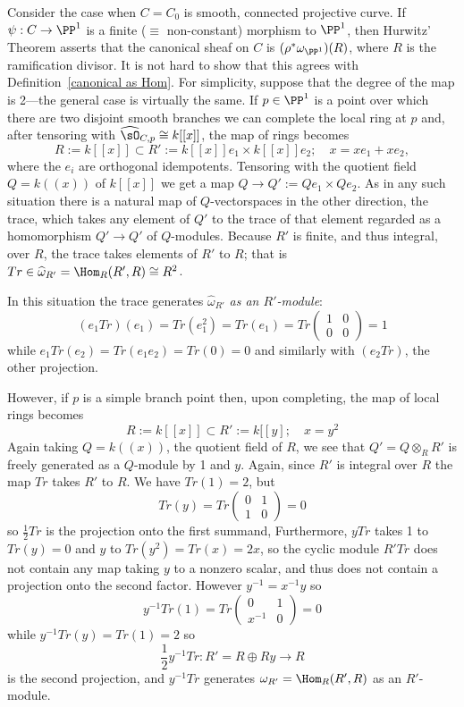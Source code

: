 \begin{example}
Consider the case when $C = C_0$ is smooth, connected projective curve. If $\psi: C\to \PP^1$ is a finite  ($\equiv$ non-constant) morphism to $\PP^1$, then Hurwitz' Theorem asserts that the canonical sheaf on
$C$ is $(\rho^*\omega_{\PP^1})(R)$, where $R$ is the ramification divisor. It is not hard to show that this
agrees with Definition~\ref{canonical as Hom}. For simplicity, suppose that the degree of the map is 2---the general case
is virtually the same. If
 $ p\in\PP^1$ is a point over which there are two disjoint smooth branches
we can complete the local ring at $p$ and, after tensoring
with $\widehat \sO_{C,p} \cong k[[x]]$, the map of rings becomes 
$$
R := k[[x]] \subset R':= k[[x]]e_1\times k[[x]]e_2; \quad x =xe_1+xe_2,
$$
where the $e_i$ are orthogonal idempotents. Tensoring with the quotient field $Q = k((x))$ of $k[[x]]$
we get a map $Q \to Q':= Qe_1\times Qe_2$. As in any such situation there is a natural map of $Q$-vectorspaces in the other direction, the trace, which takes any element of $Q'$ to the trace of that element
regarded as a homomorphism $Q' \to Q'$ of $Q$-modules. Because $R'$ is finite, and thus integral, over $R$, the trace takes elements of $R'$ to $R$; that is $Tr \in \widehat \omega_{R'} = \Hom_R(R', R) \cong R^2$.

In this situation the trace generates $\widehat \omega_{R'}$ \emph{as an $R'$-module}: 
$$
(e_1Tr) (e_1) = Tr(e_1^2) = Tr(e_1) = Tr 
\begin{pmatrix}
 1&0\\0&0
\end{pmatrix} 
=1$$
while $e_1Tr(e_2) = Tr(e_1e_2) = Tr(0) = 0$
and similarly with $(e_2Tr)$, the other projection.

However, if $p$ is a simple branch point then, upon completing, the map of local rings becomes
$$
R := k[[x]] \subset R':= k[[y]; \quad x = y^2
$$
Again taking $Q = k((x))$, the quotient field of $R$, we see that $Q' = Q\otimes_RR'$ is freely generated as a $Q$-module by 1 and $y$. Again, since $R'$ is integral over $R$ the map $Tr$ takes $R'$ to $R$.
We have $Tr(1) = 2$,  but
$$
Tr(y) = Tr
\begin{pmatrix}
 0&1\\1&0
\end{pmatrix} 
=0
$$
so $\frac{1}{2}Tr$ is the projection onto the first summand,
Furthermore, $yTr$ takes 1 to $Tr(y) =0$ and $y$ to $Tr(y^2) = Tr(x) = 2x$,
so the cyclic module $R'Tr$ does not contain any map taking $y$ to a nonzero scalar, and
thus does not contain a projection onto the second factor.
However $y^{-1}= x^{-1}y$ so
$$
y^{-1}Tr(1) = 
Tr
\begin{pmatrix}
0&1\\ x^{-1}&0
\end{pmatrix} 
=0
$$
while
$
y^{-1}Tr(y) = Tr(1) = 2
$
so 
$$
\frac{1}{2}y^{-1}Tr: R' = R\oplus Ry \to R
$$
 is the second projection, and $y^{-1}Tr$ generates $\omega_{R'} = \Hom_R(R', R)$ as an $R'$-module.


\end{example}
